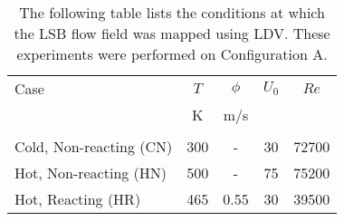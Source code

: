 \begin{table}
  \caption[Test conditions for studying preheat temperature effects]{The following table lists the conditions at which the LSB flow field was mapped using LDV. These experiments were performed on Configuration A.}
  \begin{center}
    \begin{tabular}{lcccc}
      Case & \(T\) & \(\phi\) & \(U_0\) & \(Re\) \tabularnewline
      & K & m/s & & \tabularnewline
      \hline\hline
      & & & & \tabularnewline
      Cold, Non-reacting (CN) & 300 & - & 30 & 72700 \tabularnewline
      Hot, Non-reacting (HN) & 500 & - & 75 & 75200 \tabularnewline
      Hot, Reacting (HR) & 465 & 0.55 & 30 & 39500 \tabularnewline
      \hline
    \end{tabular}
  \end{center}
  \label{tab:temperatureCases}
\end{table}

